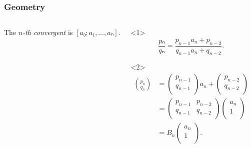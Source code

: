 \documentclass[aspectratio=169]{beamer}
\begin{document}
\begin{frame}
  \frametitle{Geometry}
  \small

  \begin{columns}[T]
    The \emph{$n$-th convergent} is $[a₀; a₁, …, aₙ]$.
    \begin{lemma}
      \begin{onlyenv}<1>
        \[
          \frac{pₙ}{qₙ} = \frac{p_{n-1} a_n + p_{n-2}}{q_{n-1} a_n + q_{n-2}}.
        \]
        \vspace{8em}
      \end{onlyenv}
      \begin{onlyenv}<2>
        \begin{align*}
          \binom{p_n}{q_n}
          & = \begin{pmatrix}
            p_{n-1} \\ q_{n-1} \\
          \end{pmatrix} a_n + \begin{pmatrix}
            p_{n-2} \\ q_{n-2} \\
          \end{pmatrix} \\
          & = \begin{pmatrix}
            p_{n-1} & p_{n-2} \\
            q_{n-1} & q_{n-2} \\
          \end{pmatrix}
          \begin{pmatrix}
            a_n \\
            1 \\
          \end{pmatrix} \\
          & =
          B_n
          \begin{pmatrix}
            a_n \\
            1 \\
          \end{pmatrix}.
        \end{align*}
      \end{onlyenv}
    \end{lemma}


\end{columns}
\end{frame}
\end{document}
